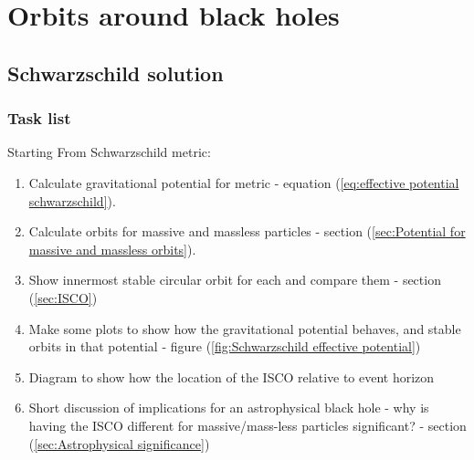 



\chapter{Orbits around black holes}




\section{Schwarzschild solution}

\subsection{Task list}

Starting From Schwarzschild metric:

\begin{enumerate}
  \item Calculate gravitational potential for metric - equation (\ref{eq:effective potential schwarzschild}).
  \item Calculate orbits for massive and massless particles - section (\ref{sec:Potential for massive and massless orbits}).
  \item Show innermost stable circular orbit for each and compare them - section (\ref{sec:ISCO})
  \item Make some plots to show how the gravitational potential behaves, and stable orbits in that potential - figure (\ref{fig:Schwarzschild effective potential})
  \item Diagram to show how the location of the ISCO relative to event horizon
  \item Short discussion of implications for an astrophysical black hole - why is having the ISCO different for massive/mass-less particles significant? - section (\ref{sec:Astrophysical significance})
\end{enumerate}

